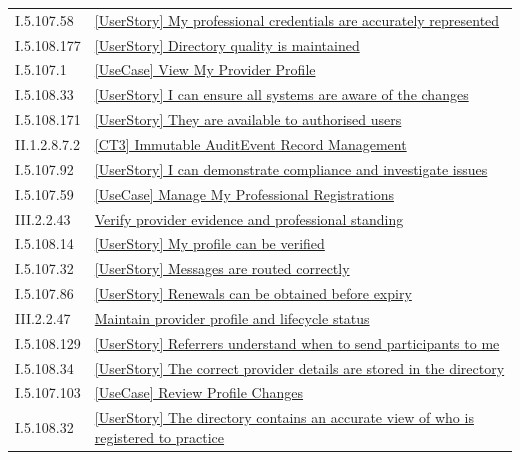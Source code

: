 \begin{longtable}{p{.22\linewidth}p{.73\linewidth}}
I.5.107.58 & \hyperref[element:6d384e059d7e40cebb9788edaec7cddd]{[UserStory] My professional credentials are accurately represented} \\
I.5.108.177 & \hyperref[element:6d38663ab9764effa3f0cb11838e6766]{[UserStory] Directory quality is maintained} \\
I.5.107.1 & \hyperref[element:6dcc2ddb4c304e40974afd85064e06b8]{[UseCase] View My Provider Profile} \\
I.5.108.33 & \hyperref[element:6dd723b3350146bb84a1c99107750899]{[UserStory] I can ensure all systems are aware of the changes} \\
I.5.108.171 & \hyperref[element:70bedf92b17c4614aebacc2100ef1b04]{[UserStory] They are available to authorised users} \\
II.1.2.8.7.2 & \hyperref[element:70e9f760ebd34045b8dd92f31fb8a00b]{[CT3] Immutable AuditEvent Record Management} \\
I.5.107.92 & \hyperref[element:7151b426d0304920b73bd7033dc7b63e]{[UserStory] I can demonstrate compliance and investigate issues} \\
I.5.107.59 & \hyperref[element:71b0b1437fef42edaa3d21feabcae427]{[UseCase] Manage My Professional Registrations} \\
III.2.2.43 & \hyperref[element:733f2f6c9a5e49ceb0107d30bc736945]{Verify provider evidence and professional standing} \\
I.5.108.14 & \hyperref[element:746278d0ab1e44cb9bac3240ec215005]{[UserStory] My profile can be verified} \\
I.5.107.32 & \hyperref[element:75defb268d974a35a7c45a620025a658]{[UserStory] Messages are routed correctly} \\
I.5.107.86 & \hyperref[element:7968363038af4439ac9451390c5fd3b5]{[UserStory] Renewals can be obtained before expiry} \\
III.2.2.47 & \hyperref[element:79cb51c0f6184273af18b5e0bac64720]{Maintain provider profile and lifecycle status} \\
I.5.108.129 & \hyperref[element:7c98d1023b1c4a97a34004c456896bab]{[UserStory] Referrers understand when to send participants to me} \\
I.5.108.34 & \hyperref[element:7dc7fc1727e848a6b1e3a81122a7ed28]{[UserStory] The correct provider details are stored in the directory} \\
I.5.107.103 & \hyperref[element:7e42d37c81b14ebeac454f15ee9ea0c3]{[UseCase] Review Profile Changes} \\
I.5.108.32 & \hyperref[element:8261774ed8044968af70b0486cbb38b9]{[UserStory] The directory contains an accurate view of who is registered to practice} \\

\end{longtable}
